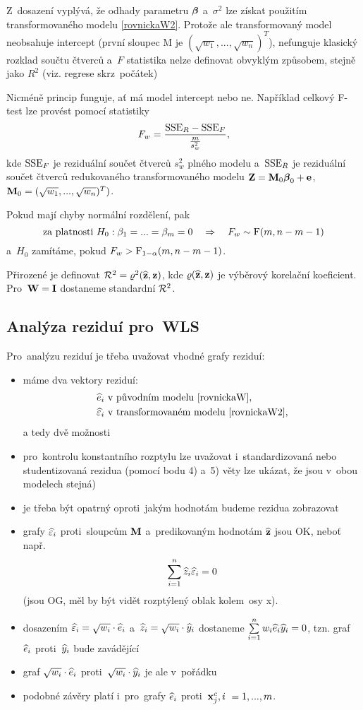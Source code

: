 Z~dosazení vyplývá, že odhady parametru $\boldsymbol{\beta}$ a~$\sigma^2$ lze získat použitím transformovaného modelu \eqref{rovnickaW2}. Protože ale transformovaný model neobsahuje intercept (první sloupec M je $(\sqrt{w_1},..., \sqrt{w_n})^T$), nefunguje klasický rozklad součtu čtverců a~$F$ statistika nelze definovat obvyklým způsobem, stejně jako $R^2$ (viz. regrese skrz~počátek)

Nicméně princip  funguje, ať má model intercept nebo ne. Například celkový F-test lze provést pomocí statistiky
$$ F_w = \frac{\mathrm{SSE}_R - \mathrm{SSE}_F}{\frac{m}{s_w^2}}, $$
kde $\mathrm{SSE}_F$ je reziduální součet čtverců $s_w^2$ plného modelu a~$\mathrm{SSE}_R$ je reziduální součet čtverců redukovaného transformovaného modelu $\textbf{Z} = \textbf{M}_0 \boldsymbol{\beta}_0 + \mathbf{e}$, $\textbf{M}_0 = (\sqrt{w_1},..., \sqrt{w_n})^T)$.
	
Pokud mají chyby normální rozdělení, pak
$$\text{za platnosti } H_0: \beta_1 = ... = \beta_m = 0 \quad \Rightarrow \quad F_w \sim \mathrm{F}(m, n-m-1)$$
a~$H_0$ zamítáme, pokud $F_w > \mathrm{F}_{1-\alpha}(m,n-m-1)$.
	
Přirozené je definovat $\mathcal{R}^2 = \varrho^2(\widehat{\mathbf{z}}, \mathbf{z})$, kde $\varrho(\widehat{\mathbf{z}}, \mathbf{z})$ je výběrový korelační koeficient. Pro~$\textbf{W} = \textbf{I}$ dostaneme standardní $\mathcal{R}^2$.
	
\subsection{Analýza reziduí pro~WLS}
	Pro~analýzu reziduí je třeba uvažovat vhodné grafy reziduí:
	\begin{itemize}
		\item máme dva vektory reziduí:
		\begin{align*}
			& \widehat{e}_i \text{ v~původním modelu \eqref{rovnickaW}}, \\
			& \widehat{\varepsilon}_i \text{ v~transformovaném modelu \eqref{rovnickaW2}},
		\end{align*}
		a tedy dvě možnosti
		\item pro~kontrolu konstantního rozptylu lze uvažovat i~standardizovaná nebo studentizovaná rezidua (pomocí bodu 4) a~5) věty lze ukázat, že jsou v~obou modelech stejná)
		\item je třeba být opatrný oproti~jakým hodnotám budeme rezidua zobrazovat
		\item grafy $\widehat{\varepsilon}_i$ proti~sloupcům $\textbf{M}$ a~predikovaným hodnotám $\widehat{\mathbf{z}}$ jsou OK, neboť např.
		 $$
		\sum\limits_{i=1}^{n} \widehat{z}_i \widehat{\varepsilon}_i = 0
		 $$
		(jsou OG, měl by být vidět rozptýlený oblak kolem~osy x).
		\item dosazením $\widehat{\varepsilon}_i = \sqrt{w_i}  \cdot \widehat{e}_i$ a~$\widehat{z}_i = \sqrt{w_i} \cdot \widehat{y}_i$ dostaneme $\sum\limits_{i=1}^{n} w_i \widehat{e}_i \widehat{y}_i = 0$, tzn. graf $\widehat{e}_i$ proti~$\widehat{y}_i$ bude zavádějící
		\item graf $\sqrt{w_i}  \cdot \widehat{e}_i$ proti~$\sqrt{w_i}  \cdot \widehat{y}_i$ je ale v~pořádku
		\item podobné závěry platí i~pro~grafy $\widehat{e}_i$ proti~$\mathbf{x}_j^c, i~ = 1,..., m$.
	\end{itemize}


